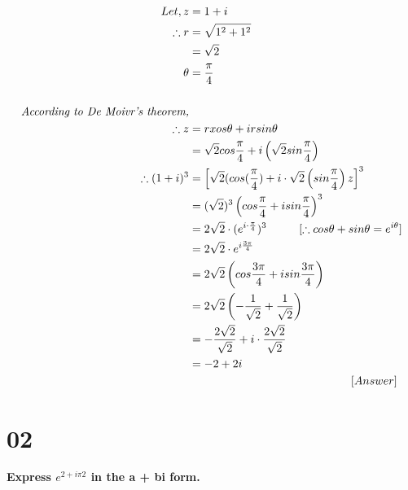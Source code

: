\documentclass[12pt]{article}
\begin{document}
\begin{align*}
    Let,
    z &= 1 + i
    \\
    \therefore r &= \sqrt{1^2 + 1^2}
    \\
    &= \sqrt{2}
    \\
    \theta &= \frac{\pi}{4}
    \\ \\
    \textit{According to De Moivr's theorem,}
    \\
    \therefore z&= r xos\theta + i r sin\theta
    \\
    &= \sqrt{2} cos \frac{\pi}{4} + i \left(\sqrt{2} sin \frac{\pi}{4}\right)
    \\
    \therefore (1+i)^3 &= \left[\sqrt{2} (cos(\frac{\pi}{4}) + i \cdot \sqrt{2} \left(sin \frac{\pi}{4} \right)z \right]^3
    \\
    &= (\sqrt{2})^3 \left(cos\frac{\pi}{4} + i sin \frac{\pi}{4} \right)^3
    \\
    &= 2\sqrt{2} \cdot (e^{i \cdot \frac{\pi}{4}})^3 \hspace{10mm} [\therefore cos\theta + sin\theta = e^{i\theta}]
    \\
    &= 2\sqrt{2} \cdot e^{i \frac{3\pi}{4}}
    \\
    &= 2\sqrt{2} \left(cos \frac{3\pi}{4} + i sin \frac{3 \pi }{4}\right)
    \\
    &= 2\sqrt{2} \left(-\frac{1}{\sqrt{2}} + \frac{1}{\sqrt{2}}\right)
    \\
    &= -\frac{2\sqrt{2}}{\sqrt{2}} + i \cdot \frac{2\sqrt{2}}{\sqrt{2}}
    \\
    &= -2 + 2 i
    \\
    &\hspace{50mm}[Answer]
\end{align*}
\pagebreak


                

\chapter{02}
\textbf{Express $e^{2+i \pi 2}$ in the a + bi form.}
\end{document}
